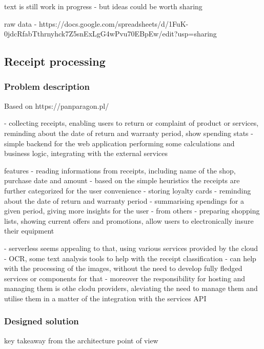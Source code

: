 text is still work in progress - but ideas could be worth sharing 

raw data - https://docs.google.com/spreadsheets/d/1FuK-0jdcRfabTthrnyhck7Z5snExLgG4wPvu70EBpEw/edit?usp=sharing

\subsection{Receipt processing}

\subsubsection{Problem description}

Based on https://panparagon.pl/

- collecting receipts, enabling users to return or complaint of product or services, reminding about the date of return and warranty period, show spending stats
- simple backend for the web application performing some calculations and business logic, integrating with the external services

features
- reading informations from receipts, including name of the shop, purchase date and amount
- based on the simple heuristics the receipts are further categorized for the user convenience
- storing loyalty cards
- reminding about the date of return and warranty period
- summarising spendings for a given period, giving more insights for the user
- from others - preparing shopping lists, showing current offers and promotions, allow users to electronically insure their equipment

- serverless seems appealing to that, using various services provided by the cloud - OCR, some text analysis tools to help with the receipt classification - can help with the processing of the images, without the need to develop fully fledged services or components for that
- moreover the responsibility for hosting and managing them is othe clodu providers, aleviating the need to manage them and utilise them in a matter of the integration with the services API

\subsubsection{Designed solution}

key takeaway from the architecture point of view

